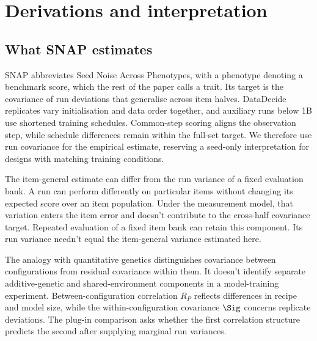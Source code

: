 \section{Derivations and interpretation}
\label{app:derivations}
\subsection{What SNAP estimates}
SNAP abbreviates Seed Noise Across Phenotypes, with a phenotype denoting a benchmark score, which the rest of the paper calls a trait. Its target is the covariance of run deviations that generalise across item halves. DataDecide replicates vary initialisation and data order together, and auxiliary runs below 1B use shortened training schedules. Common-step scoring aligns the observation step, while schedule differences remain within the full-set target. We therefore use run covariance for the empirical estimate, reserving a seed-only interpretation for designs with matching training conditions.

The item-general estimate can differ from the run variance of a fixed evaluation bank. A run can perform differently on particular items without changing its expected score over an item population. Under the measurement model, that variation enters the item error and doesn't contribute to the cross-half covariance target. Repeated evaluation of a fixed item bank can retain this component. Its run variance needn't equal the item-general variance estimated here.

The analogy with quantitative genetics distinguishes covariance between configurations from residual covariance within them. It doesn't identify separate additive-genetic and shared-environment components in a model-training experiment. Between-configuration correlation $R_P$ reflects differences in recipe and model size, while the within-configuration covariance $\Sig$ concerns replicate deviations. The plug-in comparison asks whether the first correlation structure predicts the second after supplying marginal run variances.

